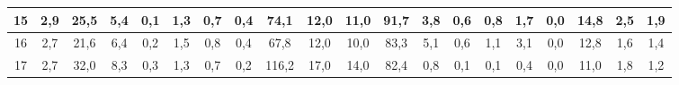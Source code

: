 \begin{sidewaystable}[]
\begin{tabular}{|c|c|c|c|c|c|c|c|c|c|c|c|c|c|c|c|c|c|c|c|}
    15 & 2,9                                              & 25,5                                             & 5,4                                              & 0,1                                              & 1,3                                              & 0,7                                              & 0,4                                              & 74,1                                            & 12,0                                            & 11,0                                            & 91,7                                            & 3,8                                             & 0,6                                             & 0,8                                             & 1,7                                             & 0,0                                             & 14,8                                             & 2,5                                              & 1,9                                              \\ \hline
    16 & 2,7                                              & 21,6                                             & 6,4                                              & 0,2                                              & 1,5                                              & 0,8                                              & 0,4                                              & 67,8                                            & 12,0                                            & 10,0                                            & 83,3                                            & 5,1                                             & 0,6                                             & 1,1                                             & 3,1                                             & 0,0                                             & 12,8                                             & 1,6                                              & 1,4                                              \\ \hline
    17 & 2,7                                              & 32,0                                             & 8,3                                              & 0,3                                              & 1,3                                              & 0,7                                              & 0,2                                              & 116,2                                           & 17,0                                            & 14,0                                            & 82,4                                            & 0,8                                             & 0,1                                             & 0,1                                             & 0,4                                             & 0,0                                             & 11,0                                             & 1,8                                              & 1,2                                              \\ \hline

\end{tabular}
\end{sidewaystable}
